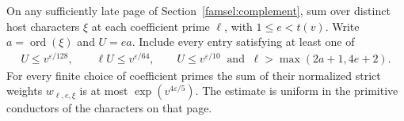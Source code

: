 \begin{proposition}
\label{adds:order}
On any sufficiently late page of Section~\ref{famsel:complement},
sum over distinct host characters \(\xi\) at each coefficient
prime \(\ell\), with \(1\le e<t(v)\). Write
\(a=\operatorname{ord}(\xi)\) and \(U=ea\). Include every entry
satisfying at least one of
\[
 \begin{gathered}
 U\le v^{\varepsilon/128},\qquad \ell U\le v^{\varepsilon/64},
 \qquad
 U\le v^{\varepsilon/10}\ \text{ and }\
                  \ell>\max(2a+1,4e+2).
 \end{gathered}
\]
For every finite choice of coefficient primes the sum of their
normalized strict weights \(w_{\ell,e,\xi}\) is at most
\(\exp(v^{4\varepsilon/5})\). The estimate is uniform in the
primitive conductors of the characters on that page.
\end{proposition}
